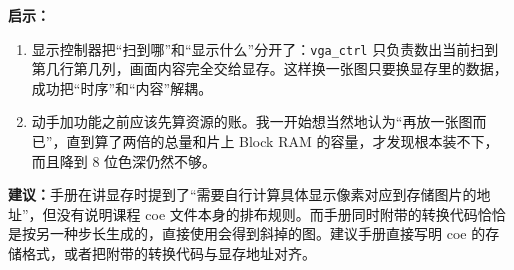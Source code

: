 \documentclass[12pt, a4paper]{ctexart}
\begin{document}
\textbf{启示：}
\begin{enumerate}
    \item 显示控制器把“扫到哪”和“显示什么”分开了：\texttt{vga\_ctrl} 只负责数出当前扫到第几行第几列，画面内容完全交给显存。这样换一张图只要换显存里的数据，成功把“时序”和“内容”解耦。
    \item 动手加功能之前应该先算资源的账。我一开始想当然地认为“再放一张图而已”，直到算了两倍的总量和片上 Block RAM 的容量，才发现根本装不下，而且降到 8 位色深仍然不够。
\end{enumerate}

\textbf{建议：}手册在讲显存时提到了“需要自行计算具体显示像素对应到存储图片的地址”，但没有说明课程 coe 文件本身的排布规则。而手册同时附带的转换代码恰恰是按另一种步长生成的，直接使用会得到斜掉的图。建议手册直接写明 coe 的存储格式，或者把附带的转换代码与显存地址对齐。
\end{document}
